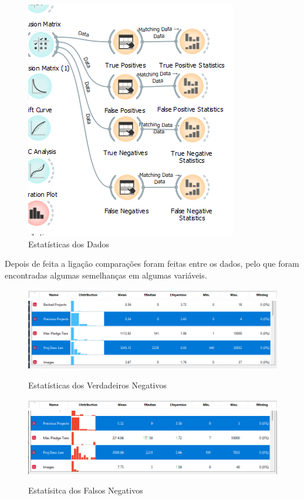 \begin{figure}[H]
    \centering
    \includegraphics[scale=0.6]{images/TrueAndFalseNegativeStats.png}
     \caption{Estatísticas dos Dados}
\end{figure}

Depois de feita a ligação comparações foram feitas entre os dados, pelo que foram encontradas algumas semelhanças em algumas variáveis.

\begin{figure}[H]
    \centering
    \includegraphics[scale=0.5]{images/stats.png}
    \includegraphics[scale=0.48]{images/TrueNegativeStats.png}
     \caption{Estatísticas dos Verdadeiros Negativos}
\end{figure}

\begin{figure}[H]
    \centering
    \includegraphics[scale=0.5]{images/stats.png}
    \includegraphics[scale=0.5]{images/FalseNegativeStats.png}
     \caption{Estatísitca dos Falsos Negativos}
\end{figure}

